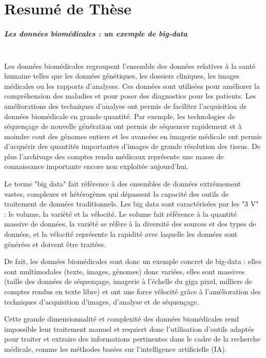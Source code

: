 \chapter{Resumé de Thèse}
\paragraph{\textbf{Les données biomédicales : un exemple de big-data}}\mbox{}\\

Les données biomédicales regroupent l’ensemble des données relatives à la santé humaine telles que les données génétiques, les dossiers cliniques, les images médicales ou les rapports d’analyses. Ces données sont utilisées pour améliorer la compréhension des maladies et pour poser des diagnostics pour les patients. Les améliorations des techniques d’analyse ont permis de faciliter l’acquisition de données biomédicale en grande quantité. Par exemple, les technologies de séquençage de nouvelle génération ont permis de séquencer rapidement et à moindre cout des génomes entiers et les avancées en imagerie médicale ont permis d'acquérir des quantités importantes d’images de grande résolution des tissus. De plus l’archivage des comptes rendu médicaux représente une masse de connaissance importante encore non exploitée aujourd’hui.

Le terme "big data" fait référence à des ensembles de données extrêmement vastes, complexes et hétérogènes qui dépassent la capacité des outils de traitement de données traditionnels. Les big data sont caractérisées par les "3 V" : le volume, la variété et la vélocité. Le volume fait référence à la quantité massive de données, la variété se réfère à la diversité des sources et des types de données, et la vélocité représente la rapidité avec laquelle les données sont générées et doivent être traitées.

De fait, les données biomédicales sont donc un exemple concret de big-data : elles sont multimodales (texte, images, génomes) donc variées, elles sont massives (taille des données de séquençage, imagerie à l’échelle du giga pixel, milliers de comptes rendus en texte libre) et ont une force vélocité grâce à l’amélioration des techniques d’acquisition d’images, d’analyse et de séquençage.

Cette grande dimensionnalité et complexité des données biomédicales rend impossible leur traitement manuel et requiert donc l’utilisation d’outils adaptés pour traiter et extraire des informations pertinentes dans le cadre de la recherche médicale, comme les méthodes basées sur l’intelligence artificielle (IA).

